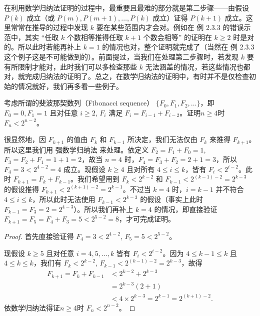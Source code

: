 在利用数学归纳法证明的过程中，最重要且最难的部分就是第二步骤——由假设 $P(k)$ 成立（或 $P(m), P(m + 1), \ldots , P(k)$ 成立）证得 $P(k + 1)$ 成立。这里常常在推导的过程中发现 $k$ 要在某些范围内才会对。例如在 例 2.3.3 的错误示范中，其实 “任取 $k$ 个数相等推得任取 $k + 1$ 个数会相等” 的证明在 $k \ge 2$ 时是对的。所以此时若能再补上 $k = 1$ 的情况也对，整个证明就完成了（当然在 例 2.3.3 这个例子这是不可能做到的）。前面提过，当我们在处理第二步骤时，若发现 $k$ 要有所限制才能对，此时我们可以多检查那些 $k$ 无法涵盖的情况，若这些情况也都对，就完成归纳法的证明了。总之，在数学归纳法的证明中，有时并不是仅检查初始的情况就好，我们再多看一些例子。

\begin{example}
考虑所谓的斐波那契数列（Fibonacci sequence） $\{F_0, F_1, F_2, \ldots \}$，即 $F_0 = 0, F_1 = 1$ 且对任意 $i \ge 2$, $F_i$ 满足 $F_i = F_{i - 1} + F_{i - 2}$。证明$n \ge 4$时 $F_n < 2^{n - 2}$。
\end{example}

很显然地，因 $F_{k + 1}$ 的值由 $F_{k}$ 和 $F_{k - 1}$ 所决定，我们无法仅由 $F_{k}$ 来推得 $F_{k + 1}$。所以这里我们用 强数学归纳法 来处理。依定义 $F_2 = F_1 + F_0 = 1$, $F_3 = F_2 + F_1 = 1 + 1 = 2$，故当 $n = 4$ 时，$F_4 = F_3 + F_2 = 2 + 1 = 3$，所以 $F_4 = 3 < 2^{4 - 2} = 4$ 成立。现假设 $k \ge 4$ 且对所有 $4 \le i \le k$，皆有 $F_i < 2^{i - 2}$。此时 $F_{k + 1} = F_k + F_{k - 1}$。我们希望用到 $F_k < 2^{k - 2}$ 和 $F_{k - 1} < 2^{(k - 1) - 2} = 2^{k - 3}$ 的假设推得 $F_{k + 1} < 2^{(k + 1) - 2} = 2^{k - 1}$。不过当 $k = 4$ 时，$i = k - 1$ 并不符合 $4 \le i \le k$，所以此时无法使用 $F_{k - 1} < 2^{k - 3}$ 的假设（事实上此时 $F_{k - 1} = F_3 = 2 = 2^{4 - 3}$）。所以我们再补上 $k = 4$ 的情况，即直接验证 $F_{k + 1} = F_5 = F_4 + F_3 = 5 < 2^{5 - 2} = 8$，才可完成证明。

\begin{proof}
首先直接验证得 $F_4 = 3 < 2^{4 - 2}$, $F_5 = 5 < 2^{5 - 2}$。

现假设 $k \ge 5$ 且对任意 $i = 4, 5, \ldots , k$ 皆有 $F_i < 2^{i - 2}$。因为 $4 \le k - 1 \le k$ 且 $4 \le k \le k$，我们有 $F_k < 2^{k - 2}$, $F_{k - 1} < 2^{(k - 1) - 2} = 2^{k - 3}$，故得
\[
\begin{aligned}
    F_{k + 1} = F_{k} + F_{k - 1} &< 2^{k - 2} + 2^{k - 3} \\&= 2^{k - 3}(2 + 1) \\&< 4 \times 2^{k - 3} = 2^{k - 1} = 2^{(k + 1) - 2}.
\end{aligned}
\]
依数学归纳法得证$n \ge 4$时 $F_n < 2^{n - 2}$。
\end{proof}

